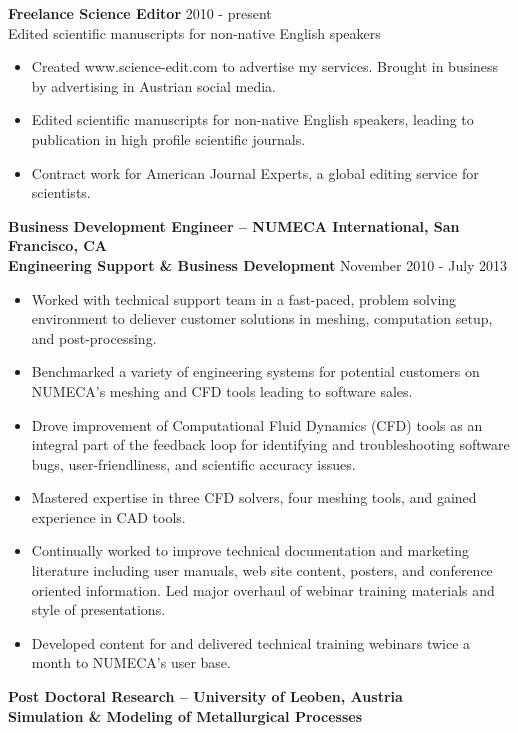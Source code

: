 \documentclass[11pt]{res} %
\begin{document}
\begin{resume}
\vspace{4pt}
{\bf Freelance Science Editor}  2010 - present\\
Edited scientific manuscripts for non-native English speakers
\begin{itemize} \itemsep -1pt 
  \item Created www.science-edit.com to advertise my services. Brought in business by advertising in Austrian social media.
  \item Edited scientific manuscripts for non-native English speakers, leading to publication in high profile scientific journals.
  \item Contract work for American Journal Experts, a global editing service for scientists.
\end{itemize}


{\bf Business Development Engineer -- NUMECA International, San Francisco, CA} \\
{\bf Engineering Support \& Business Development}
November 2010 - July 2013
\begin{itemize} \itemsep -1pt 
	\item Worked with technical support team in a fast-paced, problem solving environment to deliever customer solutions in meshing, computation setup, and post-processing. 
		\item Benchmarked a variety of engineering systems for potential customers on NUMECA's meshing and CFD tools leading to software sales. 
		\item Drove improvement of Computational Fluid Dynamics (CFD) tools as an integral part of the feedback loop for identifying and troubleshooting software bugs, user-friendliness, and scientific accuracy issues. 
	\item Mastered expertise in three CFD solvers, four meshing tools, and gained experience in CAD tools. 
	\item Continually worked to improve technical documentation and marketing literature including user manuals, web site content, posters, and conference oriented information. Led major overhaul of webinar training materials and style of presentations.
	\item Developed content for and delivered technical training webinars twice a month to NUMECA's user base.
\end{itemize}
%
\vspace{4pt}
{\bf Post Doctoral Research -- University of Leoben, Austria} \\
{\bf Simulation \& Modeling of Metallurgical Processes}

\end{resume}
\end{document}
